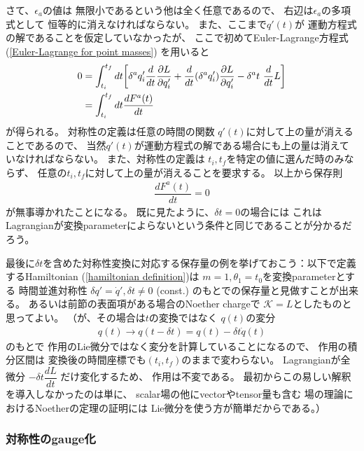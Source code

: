 さて、$\epsilon_a$の値は
無限小であるという他は全く任意であるので、
右辺は$\epsilon_a$の多項式として
恒等的に消えなければならない。
また、ここまで$q'(t)$が
運動方程式の解であることを仮定していなかったが、
ここで初めてEuler-Lagrange方程式
(\ref{Euler-Lagrange for point masses})
を用いると
\begin{align}
  0 &=
  \int_{t_i}^{t_f} dt
  \bigg[
    \delta^a q'_i
    \dfrac{d}{dt}
    \dfrac{\partial L}{\partial \dot{q}'_i}
  +
    \dfrac{d}{dt}
    (\delta^a q'_i)
    \dfrac{\partial L}{\partial \dot{q}'_i}
  -
    \delta^a t
    \ 
    \dfrac{d}{dt}
    L
  \bigg]
\notag\\&=
  \int_{t_i}^{t_f} dt
  \dfrac{dF^a(t)}{dt}
\end{align}
が得られる。
対称性の定義は任意の時間の関数
$q'(t)$に対して上の量が消えることであるので、
当然$q'(t)$が運動方程式の解である場合にも上の量は消えていなければならない。
また、対称性の定義は
$t_i, t_f$を特定の値に選んだ時のみならず、
任意の$t_i, t_f$に対して上の量が消えることを要求する。
以上から保存則
\begin{align}
  \dfrac{dF^a(t)}{dt} = 0
\end{align}
が無事導かれたことになる。
既に見たように、$\delta t = 0$の場合には
これはLagrangianが変換parameterによらないという条件と同じであることが分かるだろう。

最後に$\delta t$を含めた対称性変換に対応する保存量の例を挙げておこう：以下で定義するHamiltonian
(\ref{hamiltonian definition})は
$m=1, \theta_1 = t_0$を変換parameterとする
時間並進対称性
$\delta q' = \dot{q}', \delta t \neq 0$ (const.)
のもとでの保存量と見做すことが出来る。
あるいは前節の表面項がある場合のNoether chargeで
$\mathcal{K}=L$としたものと思ってよい。
（が、その場合は$t$の変換ではなく
$q(t)$の変分
\begin{align}
  q(t) \to q(t-\delta t)
  = q(t) - \delta t \dot{q}(t)
\end{align}
のもとで
作用のLie微分ではなく変分を計算していることになるので、
作用の積分区間は
変換後の時間座標でも$(t_i, t_f)$のままで変わらない。
Lagrangianが全微分
$- \delta t \dfrac{d L}{dt}$
だけ変化するため、
作用は不変である。
最初からこの易しい解釈を導入しなかったのは単に、
scalar場の他にvectorやtensor量も含む
場の理論におけるNoetherの定理の証明には
Lie微分を使う方が簡単だからである。）

\subsubsection{対称性のgauge化}

